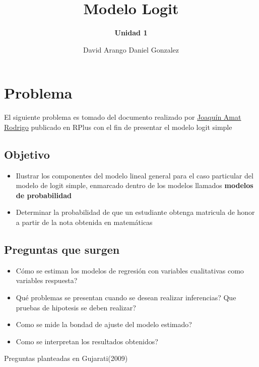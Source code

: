 \documentclass[
]{article}
\title{\textbf{Modelo Logit}}
\subtitle{{\textbf{Unidad 1}}}
\author{David Arango Daniel Gonzalez}
\date{}
\providecommand{\tightlist}{%
  \setlength{\itemsep}{0pt}\setlength{\parskip}{0pt}}
\begin{document}
\maketitle

{
\setcounter{tocdepth}{2}
\tableofcontents
}
\hypertarget{problema}{%
\section{Problema}\label{problema}}

El siguiente problema es tomado del documento realizado por
\href{https://rpubs.com/Joaquin_AR/229736}{Joaquín Amat Rodrigo}
publicado en RPlus con el fin de presentar el modelo logit simple

\hypertarget{objetivo}{%
\subsection{Objetivo}\label{objetivo}}

\begin{itemize}
\item
  Ilustrar los componentes del modelo lineal general para el caso
  particular del modelo de logit simple, enmarcado dentro de los modelos
  llamados \textbf{modelos de probabilidad}
\item
  Determinar la probabilidad de que un estudiante obtenga matricula de
  honor a partir de la nota obtenida en matemáticas
\end{itemize}

\hypertarget{preguntas-que-surgen}{%
\subsection{Preguntas que surgen}\label{preguntas-que-surgen}}

\begin{itemize}
\tightlist
\item
  Cómo se estiman los modelos de regresión con variables cualitativas
  como variables respuesta?
\item
  Qué problemas se presentan cuando se desean realizar inferencias? Que
  pruebas de hipotesis se deben realizar?
\item
  Como se mide la bondad de ajuste del modelo estimado?
\item
  Como se interpretan los resultados obtenidos?
\end{itemize}

Preguntas planteadas en Gujarati(2009)
\end{document}
